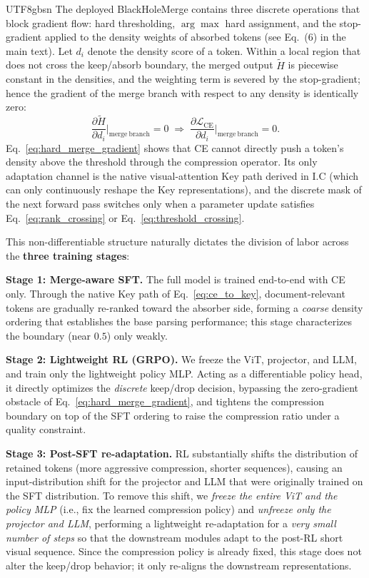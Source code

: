 \documentclass[10pt,twocolumn,letterpaper]{article}
\newcommand{\ours}{BlackHoleMerge}
\begin{document}
\begin{CJK}{UTF8}{gbsn}
The deployed \ours{} contains three discrete operations that block gradient flow:
hard thresholding, $\arg\max$ hard assignment, and the stop-gradient applied to the
density weights of absorbed tokens (see Eq.~(6) in the main text). Let $d_i$ denote the
density score of a token. Within a local region that does not cross the keep/absorb
boundary, the merged output $\widetilde H$ is piecewise constant in the densities, and the
weighting term is severed by the stop-gradient; hence the gradient of the merge branch
with respect to any density is identically zero:
\begin{equation}
    \frac{\partial\widetilde H}{\partial d_i}\bigg|_{\mathrm{merge\ branch}}=0
    \;\Longrightarrow\;
    \frac{\partial\mathcal{L}_{\mathrm{CE}}}{\partial d_i}\bigg|_{\mathrm{merge\ branch}}=0 .
    \label{eq:hard_merge_gradient}
\end{equation}
Eq.~\eqref{eq:hard_merge_gradient} shows that CE cannot directly push a token's density
above the threshold through the compression operator. Its only adaptation channel is the
native visual-attention Key path derived in I.C (which can only continuously reshape the
Key representations), and the discrete mask of the next forward pass switches only when a
parameter update satisfies Eq.~\eqref{eq:rank_crossing} or
Eq.~\eqref{eq:threshold_crossing}.

This non-differentiable structure naturally dictates the division of labor across the
\textbf{three training stages}:

\textbf{Stage 1: Merge-aware SFT.} The full model is trained end-to-end with CE only.
Through the native Key path of Eq.~\eqref{eq:ce_to_key}, document-relevant tokens are
gradually re-ranked toward the absorber side, forming a \emph{coarse} density ordering
that establishes the base parsing performance; this stage characterizes the boundary
(near $0.5$) only weakly.

\textbf{Stage 2: Lightweight RL (GRPO).} We freeze the ViT, projector, and LLM, and train
only the lightweight policy MLP. Acting as a differentiable policy head, it directly
optimizes the \emph{discrete} keep/drop decision, bypassing the zero-gradient obstacle of
Eq.~\eqref{eq:hard_merge_gradient}, and tightens the compression boundary on top of the SFT
ordering to raise the compression ratio under a quality constraint.

\textbf{Stage 3: Post-SFT re-adaptation.} RL substantially shifts the distribution of
retained tokens (more aggressive compression, shorter sequences), causing an input-distribution
shift for the projector and LLM that were originally trained on the SFT distribution. To
remove this shift, we \emph{freeze the entire ViT and the policy MLP} (i.e., fix the learned
compression policy) and \emph{unfreeze only the projector and LLM}, performing a lightweight
re-adaptation for a \emph{very small number of steps} so that the downstream modules adapt to
the post-RL short visual sequence. Since the compression policy is already fixed, this stage
does not alter the keep/drop behavior; it only re-aligns the downstream representations.


\end{CJK}
\end{document}
